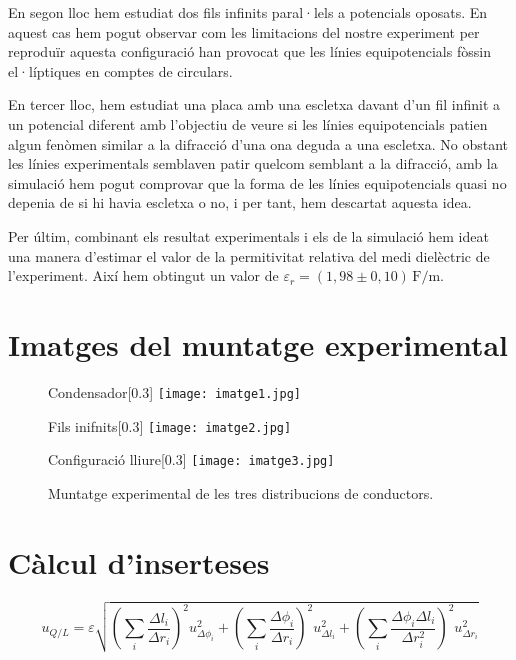 \documentclass[11pt]{article}
\begin{document}
En segon lloc hem estudiat dos fils infinits paral·lels a potencials oposats. En aquest cas hem pogut observar com les limitacions del nostre experiment per reproduïr aquesta configuració han provocat que les línies equipotencials fòssin el·líptiques en comptes de circulars.

En tercer lloc, hem estudiat una placa amb una escletxa davant d'un fil infinit a un potencial diferent amb l'objectiu de veure si les línies equipotencials patien algun fenòmen similar a la difracció d'una ona deguda a una escletxa. No obstant les línies experimentals semblaven patir quelcom semblant a la difracció, amb la simulació hem pogut comprovar que la forma de les línies equipotencials quasi no depenia de si hi havia escletxa o no, i per tant, hem descartat aquesta idea.

Per últim, combinant els resultat experimentals i els de la simulació hem ideat una manera d'estimar el valor de la permitivitat relativa del medi dielèctric de l'experiment. Així hem obtingut un valor de $\varepsilon_r=(1,98 \pm 0,10)\, \mathrm{F/m}$.

\label{sec: annex}
\section{Imatges del muntatge experimental}\label{fotos}
\begin{figure}[h!]
    \centering

    \begin{subcaptionbox}{Condensador\label{fig:img1}}[0.3\textwidth]
        {\texttt{[image: imatge1.jpg]}}
    \end{subcaptionbox}
    \hfill
    \begin{subcaptionbox}{Fils inifnits\label{fig:img2}}[0.3\textwidth]
        {\texttt{[image: imatge2.jpg]}}
    \end{subcaptionbox}
    \hfill
    \begin{subcaptionbox}{Configuració lliure\label{fig:img3}}[0.3\textwidth]
        {\texttt{[image: imatge3.jpg]}}
    \end{subcaptionbox}

    \caption{Muntatge experimental de les tres distribucions de conductors.}
    \label{fig:figura3}
\end{figure}
\section{Càlcul d'inserteses}
\begin{equation}
    u_{Q/L} = \varepsilon \sqrt{
        \left( \sum_i \frac{\Delta l_i}{\Delta r_i} \right)^2 u^2_{\Delta \phi_i} +
        \left( \sum_i \frac{\Delta \phi_i}{\Delta r_i} \right)^2 u^2_{\Delta l_i} +
        \left( \sum_i \frac{\Delta \phi_i \Delta l_i}{\Delta r_i^2} \right)^2 u^2_{\Delta r_i}}
        \label{eq: ins_q}
\end{equation}
\end{document}
